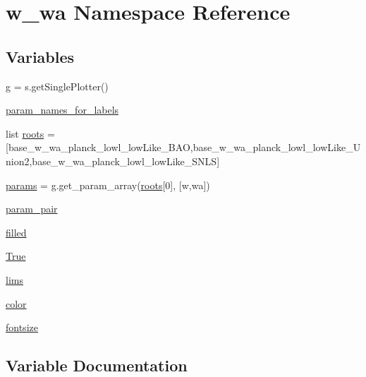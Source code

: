 \hypertarget{namespacew__wa}{}\section{w\+\_\+wa Namespace Reference}
\label{namespacew__wa}
\subsection*{Variables}
\begin{DoxyCompactItemize}
\item 
\mbox{\hyperlink{namespacew__wa_a2e6c375f064019512a5c2b3440dc1b1b}{g}} = s.\+get\+Single\+Plotter()
\item 
\mbox{\hyperlink{namespacew__wa_a050cec9076ce56e7d2706e24fe27c7b6}{param\+\_\+names\+\_\+for\+\_\+labels}}
\item 
list \mbox{\hyperlink{namespacew__wa_a6cae39e601157fb0f473f6a4e6a6602e}{roots}} = \mbox{[}\textquotesingle{}base\+\_\+w\+\_\+wa\+\_\+planck\+\_\+lowl\+\_\+low\+Like\+\_\+\+B\+AO\textquotesingle{},\textquotesingle{}base\+\_\+w\+\_\+wa\+\_\+planck\+\_\+lowl\+\_\+low\+Like\+\_\+\+Union2\textquotesingle{},\textquotesingle{}base\+\_\+w\+\_\+wa\+\_\+planck\+\_\+lowl\+\_\+low\+Like\+\_\+\+S\+N\+LS\textquotesingle{}\mbox{]}
\item 
\mbox{\hyperlink{namespacew__wa_a2e7c83bd1808be199b30a726b1536f23}{params}} = g.\+get\+\_\+param\+\_\+array(\mbox{\hyperlink{namespacew__wa_a6cae39e601157fb0f473f6a4e6a6602e}{roots}}\mbox{[}0\mbox{]}, \mbox{[}\textquotesingle{}w\textquotesingle{},\textquotesingle{}wa\textquotesingle{}\mbox{]})
\item 
\mbox{\hyperlink{namespacew__wa_acbd0a558bd7b2188c665960e86e9b258}{param\+\_\+pair}}
\item 
\mbox{\hyperlink{namespacew__wa_ad8da94912d424a042a83c9bde89cfed8}{filled}}
\item 
\mbox{\hyperlink{namespacew__wa_a60b56251b36dfe49364910aa7e83a794}{True}}
\item 
\mbox{\hyperlink{namespacew__wa_a10f3ea441746a9011298aec38003c346}{lims}}
\item 
\mbox{\hyperlink{namespacew__wa_a10f33f566e5682266b6228edbe4062ce}{color}}
\item 
\mbox{\hyperlink{namespacew__wa_a6b568a1082d7c8547e208c8be4cdf541}{fontsize}}
\end{DoxyCompactItemize}


\subsection{Variable Documentation}
\mbox{\label{namespacew__wa_a10f33f566e5682266b6228edbe4062ce}} 

